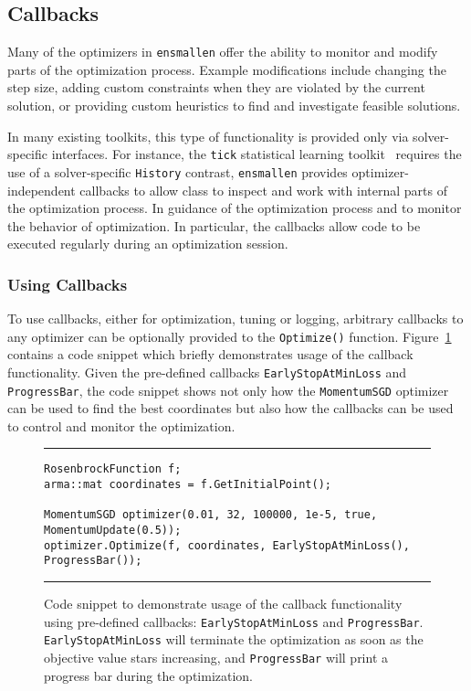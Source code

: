 \subsection{Callbacks}
\label{sec:callbacks}

Many of the optimizers in {\tt ensmallen} offer the ability to monitor
and modify parts of the optimization process.
Example modifications include changing the step size,
adding custom constraints when they are violated by the current solution,
or providing custom heuristics to find and investigate feasible solutions.

In many existing toolkits, this type of functionality is provided only via
solver-specific interfaces.  For instance, the {\tt tick} statistical learning
toolkit~\cite{bacry2017tick} requires the use of a solver-specific {\tt History}
contrast, {\tt ensmallen} provides optimizer-independent callbacks to allow
class to inspect and work with internal parts of the optimization process.  In
guidance of the optimization process and to monitor the behavior of
optimization.  In particular, the callbacks allow code to be
executed regularly during an optimization session.


\subsubsection{Using Callbacks}

To use callbacks, either for optimization, tuning or logging, 
arbitrary callbacks to any optimizer can be optionally provided
to the {\tt Optimize()} function.
Figure~\ref{fig:example_prog_callbacks} contains a code snippet which
briefly demonstrates usage of the callback functionality.  Given the pre-defined
callbacks {\tt EarlyStopAtMinLoss} and {\tt ProgressBar}, the code snippet shows
not only how the {\tt MomentumSGD} optimizer can be used to find the best
coordinates but also how the callbacks can be used to control and monitor the
optimization.

\begin{figure}[b!]
\centering
\hrule
\vspace{1ex}
\begin{verbatim}
RosenbrockFunction f;
arma::mat coordinates = f.GetInitialPoint();

MomentumSGD optimizer(0.01, 32, 100000, 1e-5, true, MomentumUpdate(0.5));
optimizer.Optimize(f, coordinates, EarlyStopAtMinLoss(), ProgressBar());
\end{verbatim}
\hrule
\vspace*{-0.5em}
\caption
  {
  Code snippet to demonstrate usage of the callback functionality using
pre-defined callbacks: \texttt{EarlyStopAtMinLoss} and \texttt{ProgressBar}.
{\tt EarlyStopAtMinLoss} will terminate the optimization as soon as the
objective value stars increasing, and {\tt ProgressBar} will print a progress
bar during the optimization.
  }
\label{fig:example_prog_callbacks}
\end{figure}



